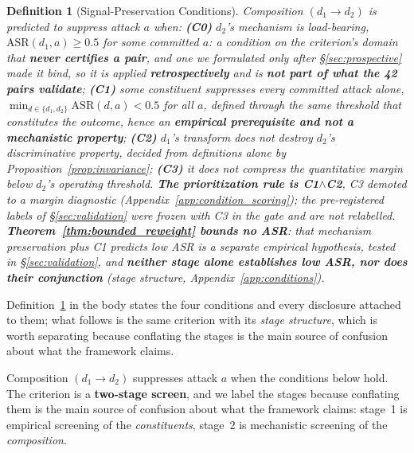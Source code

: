 \documentclass{article}
\newtheorem{definition}{Definition}
\begin{document}
\begin{definition}[Signal-Preservation Conditions]
\label{def:conditions}
Composition $(d_1 \to d_2)$ is predicted to suppress attack $a$ when: \textbf{(C0)} $d_2$'s mechanism is load-bearing, $\mathrm{ASR}(d_1,a)\ge 0.5$ for some committed $a$: a condition on the criterion's \emph{domain} that \textbf{never certifies a pair}, and one we formulated only after \S\ref{sec:prospective} made it bind, so it is applied \textbf{retrospectively} and is \textbf{not part of what the 42 pairs validate}; \textbf{(C1)} some constituent suppresses \emph{every} committed attack alone, $\min_{d\in\{d_1,d_2\}}\mathrm{ASR}(d,a) < 0.5$ for all $a$, defined through the same threshold that constitutes the outcome, hence an \textbf{empirical prerequisite and not a mechanistic property}; \textbf{(C2)} $d_1$'s transform does not destroy $d_2$'s discriminative property, decided from definitions alone by Proposition~\ref{prop:invariance}; \textbf{(C3)} it does not compress the quantitative margin below $d_2$'s operating threshold. \textbf{The prioritization rule is C1$\wedge$C2}, C3 demoted to a \emph{margin diagnostic} (Appendix~\ref{app:condition_scoring}); the pre-registered labels of \S\ref{sec:validation} were frozen with C3 in the gate and are \emph{not} relabelled. \textbf{Theorem~\ref{thm:bounded_reweight} bounds no ASR}: that mechanism preservation plus C1 predicts \emph{low} ASR is a \emph{separate} empirical hypothesis, tested in \S\ref{sec:validation}, and \textbf{neither stage alone establishes low ASR, nor does their conjunction} (stage structure, Appendix~\ref{app:conditions}).
\end{definition}

Definition~\ref{def:conditions} in the body states the four conditions and every disclosure attached to them; what follows is the same criterion with its \emph{stage structure}, which is worth separating because conflating the stages is the main source of confusion about what the framework claims.

\noindent
Composition $(d_1 \to d_2)$ suppresses attack $a$ when the conditions below hold. The criterion is a \textbf{two-stage screen}, and we label the stages because conflating them is the main source of confusion about what the framework claims: stage~1 is empirical screening of the \emph{constituents}, stage~2 is mechanistic screening of the \emph{composition}.
\end{document}

